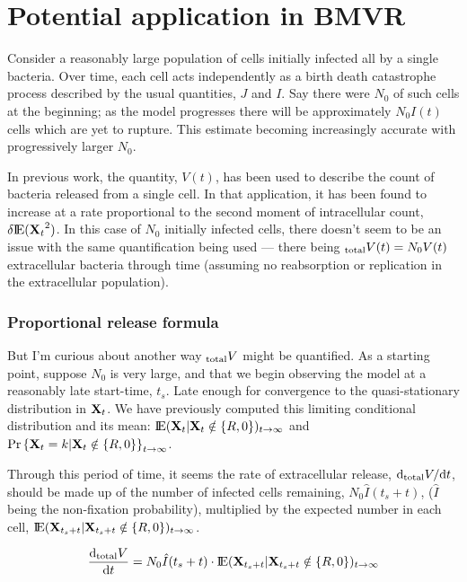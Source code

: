 \section{Potential application in BMVR}




\noindent
Consider a reasonably large population of cells initially infected all by a single \ft $\; $bacteria. Over time, each cell acts independently as a birth death catastrophe process described by the usual quantities, $J$ and $I$. Say there were $N_0$ of such cells at the beginning; as the model progresses there will be approximately $N_0 I(t)$ cells which are yet to rupture. This estimate becoming increasingly accurate with progressively larger $N_0$.\par
In previous work, the quantity, $V(t)$, has been used to describe the count of bacteria released from a single cell. In that application, it has been found to increase at a rate proportional to the second moment of intracellular count, $\delta {\rm I}\!{\rm E}({{\bf X}_t}^2)$. In this case of $N_0$ initially infected cells, there doesn't seem to be an issue with the same quantification being used --- there being $_{\text{total}} V(t) = N_0 V(t)$ extracellular bacteria through time (assuming no reabsorption or replication in the extracellular population).\par 

\subsubsection*{Proportional release formula}

But I'm curious about another way $_{\text{total}} V$ might be quantified. As a starting point, suppose $N_0$ is very large, and that we begin observing the model at a reasonably late start-time, $t_s$. Late enough for convergence to the quasi-stationary distribution in ${{\bf X}_t}$. We have previously computed this limiting conditional distribution and its mean: ${\rm I}\!{\rm E}({{\bf X}_t} | {{\bf X}_t}\notin\{R, 0\})_{t\to\infty}$ and ${\text{Pr}\left\{{{\bf X}_t} = k | {{\bf X}_t}\notin\{R, 0\}\right\}}_{t\to\infty}$. \par
Through this period of time, it seems the rate of extracellular release, ${\rm d} _{\text{total}} V/ {\rm d} t$, should be made up of the number of infected cells remaining, $N_0 \hat I(t_s + t)$, ($\hat I $ being the non-fixation probability), multiplied by the expected number in each cell, ${\rm I}\!{\rm E}({\bf X}_{t_s + t} | {\bf X}_{t_s + t}\notin\{R, 0\})_{t\to\infty}$.

$$\displaystyle\frac{{\rm d} _{\text{total}} V}{{\rm d} t} = N_0 \hat I(t_s + t) \cdot {\rm I}\!{\rm E}({\bf X}_{t_s + t} | {\bf X}_{t_s + t}\notin\{R, 0\})_{t\to\infty}$$


